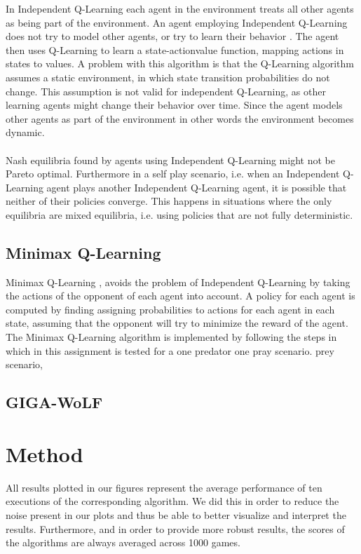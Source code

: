\documentclass[a4paper,12pt]{article}
\begin{document}
In Independent Q-Learning each agent in the environment treats all other agents as being part of the environment. An agent employing Independent Q-Learning does not try to model other agents, or try to learn their behavior \cite{vlasis}. The agent then uses Q-Learning to learn a state-actionvalue function, mapping actions in states to values.
A problem with this algorithm is that the Q-Learning algorithm \cite{SB} assumes a static environment, in which state transition probabilities do not change. This assumption is not valid for independent Q-Learning, as other learning agents might change their behavior over time. Since the agent models other agents as part of the environment in other words the environment becomes dynamic.
\\ \\
Nash equilibria found by agents using Independent Q-Learning might not be Pareto optimal. Furthermore in a self play scenario, i.e. when an Independent Q-Learning agent plays another Independent Q-Learning agent, it is possible that neither of their policies converge. This happens in situations where the only equilibria are mixed equilibria, i.e. using policies that are not fully deterministic.

\subsection{Minimax Q-Learning}

Minimax Q-Learning \cite{minimax}, avoids the problem of Independent Q-Learning by taking the actions of the opponent of each agent into account. A policy for each agent is computed by finding assigning probabilities to actions for each agent in each state, assuming that the opponent will try to minimize the reward of the agent. 
The Minimax Q-Learning algorithm is implemented by following the steps in \cite{hk} which in this assignment is tested for a one predator one pray scenario.
prey scenario,

\subsection{GIGA-WoLF}

\section{Method}

All results plotted in our figures represent the average performance of ten executions of the corresponding algorithm. We did this in order to reduce the noise present in our plots and thus be able to better visualize and interpret the results. Furthermore, and in order to provide more robust results, the scores of the algorithms are always averaged across 1000 games.
\end{document}
